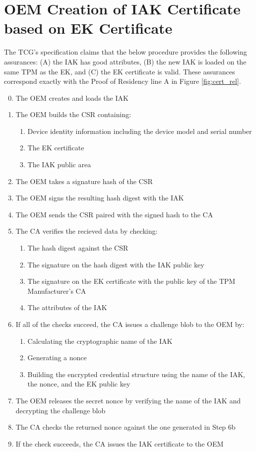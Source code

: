 \section{OEM Creation of IAK Certificate based on EK Certificate}
The TCG's specification claims that the below procedure provides the following assurances: (A) the IAK has good attributes, (B) the new IAK is  loaded on the same TPM as the EK, and (C) the EK certificate is valid. These assurances correspond exactly with the Proof of Residency line A in Figure \ref{fig:cert_rel}. 
\begin{enumerate}[itemsep=0pt,parsep=0pt,partopsep=0pt]
  \setcounter{enumi}{-1}
  \item The OEM creates and loads the IAK
  \item The OEM builds the CSR containing:
  \begin{enumerate}[topsep=0pt, itemsep=0pt,parsep=0pt,partopsep=0pt]
    \item Device identity information including the device model and serial
    number
    \item The EK certificate
    \item The IAK public area
  \end{enumerate}
  \item The OEM takes a signature hash of the CSR
  \item The OEM signs the resulting hash digest with the IAK
  \item The OEM sends the CSR paired with the signed hash to the CA
  \item The CA verifies the recieved data by checking:
  \begin{enumerate}[topsep=0pt, itemsep=0pt,parsep=0pt,partopsep=0pt]
    \item The hash digest against the CSR
    \item The signature on the hash digest with the IAK public key
    \item The signature on the EK certificate with the public key of the TPM Manufacturer's CA
    \item The attributes of the IAK
  \end{enumerate}
  \item If all of the checks succeed, the CA issues a challenge blob to the OEM by:
  \begin{enumerate}[topsep=0pt, itemsep=0pt,parsep=0pt,partopsep=0pt]
    \item Calculating the cryptographic name of the IAK
    \item Generating a nonce
    \item Building the encrypted credential structure using the name of the IAK, the nonce, and the EK public key
  \end{enumerate}
  \item The OEM releases the secret nonce by verifying the name of the IAK and decrypting the challenge blob
  \item The CA checks the returned nonce against the one generated in Step 6b
  \item If the check succeeds, the CA issues the IAK certificate to the OEM
\end{enumerate}

